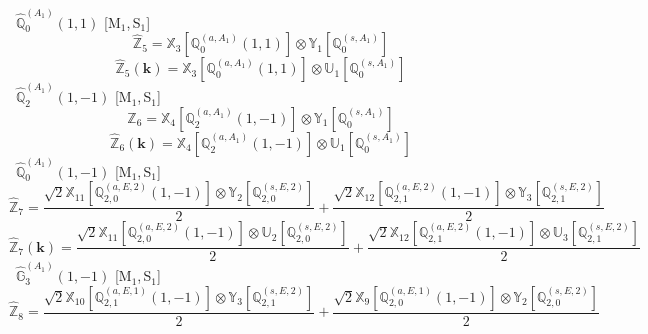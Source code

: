 \documentclass[fleqn,10pt,landscape]{article}
\begin{document}
\begin{itemize}
\begin{dmath*}
\end{dmath*}
\vspace{4mm}
\noindent {} $\,\,\,\hat{\mathbb{Q}}_{0}^{(A_{1})}(1,1)$ [M$_{1}$,\,S$_{1}$]
\begin{dmath*}
\hat{\mathbb{Z}}_{5}=\mathbb{X}_{3}[\mathbb{Q}_{0}^{(a,A_{1})}(1,1)] \otimes\mathbb{Y}_{1}[\mathbb{Q}_{0}^{(s,A_{1})}]
\end{dmath*}
\begin{dmath*}
\hat{\mathbb{Z}}_{5}(\bm{k})=\mathbb{X}_{3}[\mathbb{Q}_{0}^{(a,A_{1})}(1,1)] \otimes\mathbb{U}_{1}[\mathbb{Q}_{0}^{(s,A_{1})}]
\end{dmath*}
\vspace{4mm}
\noindent {} $\,\,\,\hat{\mathbb{Q}}_{2}^{(A_{1})}(1,-1)$ [M$_{1}$,\,S$_{1}$]
\begin{dmath*}
\hat{\mathbb{Z}}_{6}=\mathbb{X}_{4}[\mathbb{Q}_{2}^{(a,A_{1})}(1,-1)] \otimes\mathbb{Y}_{1}[\mathbb{Q}_{0}^{(s,A_{1})}]
\end{dmath*}
\begin{dmath*}
\hat{\mathbb{Z}}_{6}(\bm{k})=\mathbb{X}_{4}[\mathbb{Q}_{2}^{(a,A_{1})}(1,-1)] \otimes\mathbb{U}_{1}[\mathbb{Q}_{0}^{(s,A_{1})}]
\end{dmath*}
\vspace{4mm}
\noindent {} $\,\,\,\hat{\mathbb{Q}}_{0}^{(A_{1})}(1,-1)$ [M$_{1}$,\,S$_{1}$]
\begin{dmath*}
\hat{\mathbb{Z}}_{7}=\frac{\sqrt{2} \mathbb{X}_{11}[\mathbb{Q}_{2,0}^{(a,E,2)}(1,-1)] \otimes\mathbb{Y}_{2}[\mathbb{Q}_{2,0}^{(s,E,2)}]}{2} + \frac{\sqrt{2} \mathbb{X}_{12}[\mathbb{Q}_{2,1}^{(a,E,2)}(1,-1)] \otimes\mathbb{Y}_{3}[\mathbb{Q}_{2,1}^{(s,E,2)}]}{2}
\end{dmath*}
\begin{dmath*}
\hat{\mathbb{Z}}_{7}(\bm{k})=\frac{\sqrt{2} \mathbb{X}_{11}[\mathbb{Q}_{2,0}^{(a,E,2)}(1,-1)] \otimes\mathbb{U}_{2}[\mathbb{Q}_{2,0}^{(s,E,2)}]}{2} + \frac{\sqrt{2} \mathbb{X}_{12}[\mathbb{Q}_{2,1}^{(a,E,2)}(1,-1)] \otimes\mathbb{U}_{3}[\mathbb{Q}_{2,1}^{(s,E,2)}]}{2}
\end{dmath*}
\vspace{4mm}
\noindent {} $\,\,\,\hat{\mathbb{G}}_{3}^{(A_{1})}(1,-1)$ [M$_{1}$,\,S$_{1}$]
\begin{dmath*}
\hat{\mathbb{Z}}_{8}=\frac{\sqrt{2} \mathbb{X}_{10}[\mathbb{Q}_{2,1}^{(a,E,1)}(1,-1)] \otimes\mathbb{Y}_{3}[\mathbb{Q}_{2,1}^{(s,E,2)}]}{2} + \frac{\sqrt{2} \mathbb{X}_{9}[\mathbb{Q}_{2,0}^{(a,E,1)}(1,-1)] \otimes\mathbb{Y}_{2}[\mathbb{Q}_{2,0}^{(s,E,2)}]}{2}

\end{dmath*}
\end{itemize}
\end{document}
